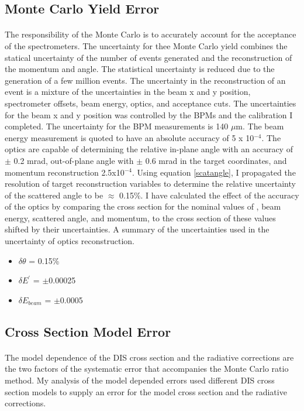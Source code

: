 \subsection{Monte Carlo Yield Error}
\paragraph{}The responsibility of the Monte Carlo is to accurately account for the acceptance of the spectrometers. The uncertainty for thee Monte Carlo yield combines the statical uncertainty of the number of events generated and the reconstruction of the momentum and angle.  The statistical uncertainty is reduced due to the generation of a few million events. The uncertainty in the reconstruction of an event is a mixture of the uncertainties in the beam x and y position, spectrometer offsets, beam energy, optics, and acceptance cuts. The uncertainties for the beam x and y position was controlled by the BPMs and the calibration I completed. The uncertainty for the BPM measurements is 140 $\mu$m. The beam energy measurement is quoted to have an absolute accuracy of 5 x 10$^{-4}$.  The optics are capable of determining the relative in-plane angle with an accuracy of $\pm$ 0.2 mrad, out-of-plane angle with $\pm$ 0.6 mrad in the target coordinates, and momentum reconstruction 2.5x10$^{-4}$\cite{HallA}.  Using equation \ref{scatangle}, I propagated the resolution of target reconstruction variables to determine the relative uncertainty of the scattered angle to be $\approx$ 0.15\%. I have calculated the effect of the accuracy of the optics by comparing the cross section for the nominal values of , beam energy, scattered angle, and momentum, to the cross section of these values shifted by their uncertainties. A summary of the uncertainties used in the uncertainty of optics reconstruction.
\begin{itemize}
\item$\delta \theta$ = 0.15\%
\item$\delta E^{\prime}$ = $\pm$0.00025
\item$\delta E_{beam}$ = $\pm$0.0005
\end{itemize}


\cite{Ar_Ti}
\subsection{Cross Section Model Error}
\paragraph{}
The model dependence of the DIS cross section and the radiative corrections are the two factors of the systematic error that accompanies the Monte Carlo ratio method. My analysis of the model depended errors used different DIS cross section models to supply an error for the model cross section and the radiative corrections.

